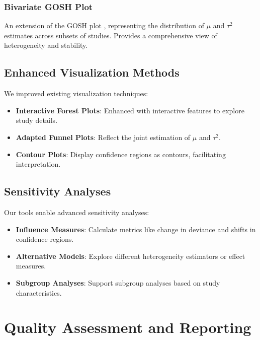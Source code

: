 \documentclass[12pt,a4paper]{report}
\begin{document}
\subsection{Bivariate GOSH Plot}
\label{subsec:bivariate_gosh_plot}

An extension of the GOSH plot \citep{olkin2012gosh}, representing the distribution of $\mu$ and $\tau^2$ estimates across subsets of studies. Provides a comprehensive view of heterogeneity and stability.

\section{Enhanced Visualization Methods}
\label{sec:enhanced_visualizations}

We improved existing visualization techniques:

\begin{itemize}
    \item \textbf{Interactive Forest Plots}: Enhanced with interactive features to explore study details.
    \item \textbf{Adapted Funnel Plots}: Reflect the joint estimation of $\mu$ and $\tau^2$.
    \item \textbf{Contour Plots}: Display confidence regions as contours, facilitating interpretation.
\end{itemize}

\section{Sensitivity Analyses}
\label{sec:sensitivity_analyses}

Our tools enable advanced sensitivity analyses:

\begin{itemize}
    \item \textbf{Influence Measures}: Calculate metrics like change in deviance and shifts in confidence regions.
    \item \textbf{Alternative Models}: Explore different heterogeneity estimators or effect measures.
    \item \textbf{Subgroup Analyses}: Support subgroup analyses based on study characteristics.
\end{itemize}

\chapter{Quality Assessment and Reporting}
\label{chap:quality_assessment}
\end{document}
